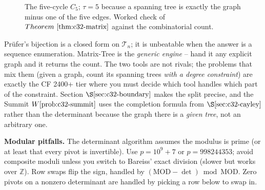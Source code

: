 \begin{figure}[H]
\centering
{}
\caption{The five-cycle \(C_5\); \(\tau=5\) because a spanning tree is
exactly the graph minus one of the five edges.  Worked check of
\(\thmref{c32-matrix}\) against the combinatorial count.}
\label{fig:c32-c5}
\end{figure}

\begin{insightbox}
Pr\"ufer's bijection is a closed form on \(\mathcal{T}_n\); it is unbeatable
when the answer is a sequence enumeration.  Matrix-Tree is the \emph{generic
engine} -- hand it any explicit graph and it returns the count.  The two
tools are not rivals; the problems that mix them (given a graph, count its
spanning trees \emph{with a degree constraint}) are exactly the CF 2400+ tier
where you must decide which tool handles which part of the constraint.
Section \(\secref{c32-boundary}\) makes the split precise, and the Summit
\(\probref{c32-summit}\) uses the completion formula from
\(\secref{c32-cayley}\) rather than the determinant because the graph there
is a \emph{given tree}, not an arbitrary one.
\end{insightbox}

\begin{notebox}
\textbf{Modular pitfalls.}  The determinant algorithm assumes the modulus is
prime (or at least that every pivot is invertible).  Use \(p=10^9+7\) or
\(p=998244353\); avoid composite moduli unless you switch to Bareiss' exact
division (slower but works over \(\mathbb{Z}\)).  Row swaps flip the sign,
handled by \((\mathrm{MOD}-\det)\bmod\mathrm{MOD}\).  Zero pivots on a
nonzero determinant are handled by picking a row below to swap in.
\end{notebox}
